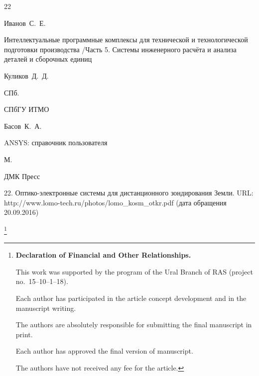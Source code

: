 \begin{thebibliography}{22}

\by Иванов~С.~Е.

\book Интеллектуальные программные комплексы для технической и технологической подготовки производства /Часть 5. Системы инженерного расчёта и анализа деталей и сборочных единиц

\ed Куликов~Д.~Д.

\publaddr СПб.

\publ СПбГУ ИТМО







\by Басов~К.~А.

\book ANSYS: справочник пользователя

\publaddr М.

\publ ДМК Пресс





22. Оптико-электронные системы для дистанционного зондирования Земли. URL: http://www.lomo-tech.ru/photos/lomo{\_}kosm{\_}otkr.pdf (дата обращения 20.09.2016)



\end{thebibliography}

\RuDate









\newpage



\makeentitle



\thanks{{\bf Declaration of Financial and Other Relationships.}

This work was supported by the program of the Ural Branch of RAS (project no.~15--10--1--18).

Each author has participated in the article concept development and in the manuscript writing.

The authors are absolutely responsible for submitting the final manuscript in print.

Each author has approved the final version of manuscript.

The authors have not received any fee for the article.

}



